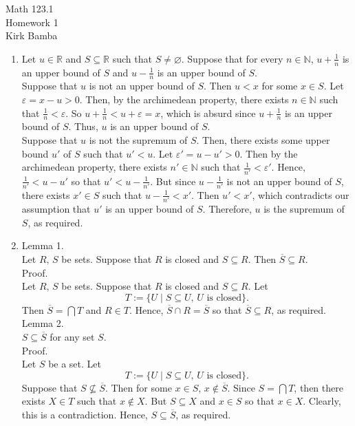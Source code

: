 \documentclass[twocolumn]{article}
\let\emptyset\varnothing
\let\eps\varepsilon
\newcommand{\naturals}{\mathbb{N}}
\newcommand{\reals}{\mathbb{R}}
\begin{document}

Math 123.1 \\
Homework 1 \\
Kirk Bamba

\begin{enumerate}
	\item
	Let $u \in \reals$ and $S \subseteq \reals$ such that $S \neq \emptyset$. Suppose that for every $n \in \naturals$, $u + \frac{1}{n}$ is an upper bound of $S$ and $u - \frac{1}{n}$ is an upper bound of $S$. \\
	Suppose that $u$ is not an upper bound of $S$. Then $u < x$ for some $x \in S$. Let $\eps = x - u > 0$. Then, by the archimedean property, there exists $n \in \naturals$ such that $\frac{1}{n} < \eps$. So $u + \frac{1}{n} < u + \eps = x$, which is absurd since $u + \frac{1}{n}$ is an upper bound of $S$. Thus, $u$ is an upper bound of $S$. \\
	Suppose that $u$ is not the supremum of $S$. Then, there exists some upper bound $u'$ of $S$ such that $u' < u$. Let $\eps' = u - u' > 0$. Then by the archimedean property, there exists $n' \in \naturals$ such that $\frac{1}{n'} < \eps'$. Hence, $\frac{1}{n'} < u - u'$ so that $u' < u - \frac{1}{n'}$. But since $u - \frac{1}{n'}$ is not an upper bound of $S$, there exists $x' \in S$ such that $u - \frac{1}{n'} < x'$. Then $u' < x'$, which contradicts our assumption that $u'$ is an upper bound of $S$. Therefore, $u$ is the supremum of $S$, as required.
	
	\item
	Lemma 1. \\
	Let $R,\, S$ be sets. Suppose that $R$ is closed and $S \subseteq R$. Then $\overline{S} \subseteq R$. \\
	Proof. \\
	Let $R,\, S$ be sets. Suppose that $R$ is closed and $S \subseteq R$. Let
	$$T := \{ U \mid S \subseteq U \text{, } U \text{ is closed} \} \text{.}$$
	Then $\overline{S} = \bigcap T$ and $R \in T$. Hence, $\overline{S} \cap R = \overline{S}$ so that $\overline{S} \subseteq R$, as required. \\
	Lemma 2. \\
	$S \subseteq \overline{S}$ for any set $S$. \\
	Proof. \\
	Let $S$ be a set. Let
	$$T := \{ U \mid S \subseteq U \text{, } U \text{ is closed} \} \text{.}$$
	Suppose that $S \not\subseteq \overline{S}$. Then for some $x \in S$, $x \not\in \overline{S}$. Since $S = \bigcap T$, then there exists $X \in T$ such that $x \not\in X$. But $S \subseteq X$ and $x \in S$ so that $x \in X$. Clearly, this is a contradiction. Hence, $S \subseteq \overline{S}$, as required. \\
	

\end{enumerate}
\end{document}
